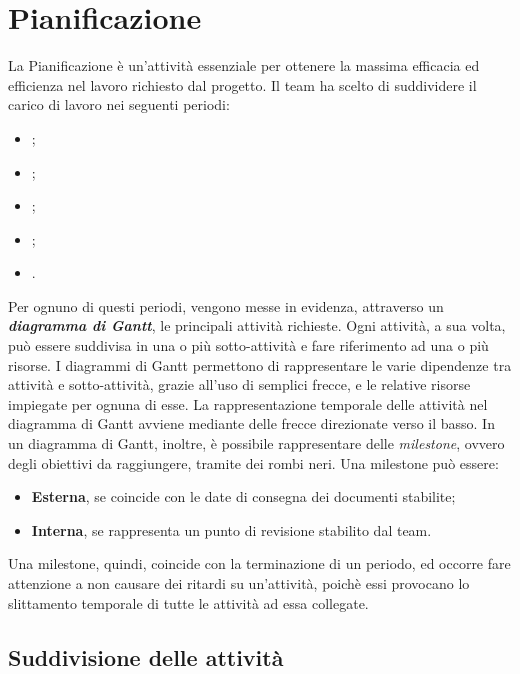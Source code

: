 \newpage

\section{Pianificazione}
La Pianificazione è un'attività essenziale per ottenere la massima efficacia ed efficienza nel lavoro richiesto dal progetto. Il team \textit{\gruppo} ha scelto di suddividere il carico di lavoro nei seguenti periodi:
\begin{itemize}
	\item \textbf{\AR};
	\item \textbf{\PA};
	\item \textbf{\PD};
	\item \textbf{\CO};
	\item \textbf{\VV}.
\end{itemize}
Per ognuno di questi periodi, vengono messe in evidenza, attraverso un \textit{\textbf{diagramma di Gantt}}, le principali attività richieste. Ogni attività, a sua volta, può essere suddivisa in una o più sotto-attività e fare riferimento ad una o più risorse. I diagrammi di Gantt permettono di rappresentare le varie dipendenze tra attività e sotto-attività, grazie all’uso di semplici frecce, e le relative risorse impiegate per ognuna di esse. La rappresentazione temporale delle attività nel diagramma di Gantt avviene mediante delle frecce direzionate verso il basso. In un diagramma di Gantt, inoltre, è possibile rappresentare delle \textit{milestone}, ovvero degli obiettivi da raggiungere, tramite dei rombi neri. Una milestone può essere:
\begin{itemize}
	\item \textbf{Esterna}, se coincide con le date di consegna dei documenti stabilite;
	\item \textbf{Interna}, se rappresenta un punto di revisione stabilito dal team.
\end{itemize}
Una milestone, quindi, coincide con la terminazione di un periodo, ed occorre fare attenzione a non causare dei ritardi su un'attività, poichè essi provocano lo slittamento temporale di tutte le attività ad essa collegate.

	\subsection{Suddivisione delle attività}

